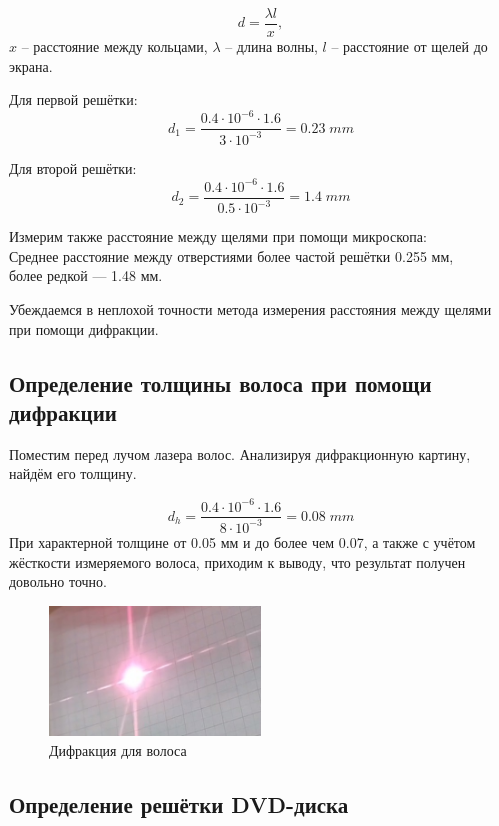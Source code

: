 \documentclass[titlepage, a4paper,12pt]{article}
\begin{document}
	$$ d = \frac{\lambda l}{x}, $$
	$x$ -- расстояние между кольцами, $\lambda$ -- длина волны, $l$ -- расстояние от щелей до экрана.
	
	Для первой решётки: \\
	$$ d_1 = \frac{0.4 \cdot 10^{-6} \cdot 1.6}{3 \cdot 10^{-3}} = 0.23 \; mm $$
	
	Для второй решётки: \\
	$$ d_2 = \frac{0.4 \cdot 10^{-6} \cdot 1.6}{0.5 \cdot 10^{-3}} = 1.4 \; mm $$
	
	
	Измерим также расстояние между щелями при помощи микроскопа:\\
	Среднее расстояние между отверстиями более частой решётки 0.255 мм, \\
	более редкой --- 1.48 мм.
	
	Убеждаемся в неплохой точности метода измерения расстояния между щелями при помощи дифракции.
	
	\subsection{Определение толщины волоса при помощи дифракции}
	
	Поместим перед лучом лазера волос. Анализируя дифракционную картину, найдём его толщину.
	
	$$ d_h = \frac{0.4 \cdot 10^{-6} \cdot 1.6}{8 \cdot 10^{-3}} = 0.08 \; mm  $$
	При характерной толщине от 0.05 мм и до более чем 0.07, а также с учётом жёсткости измеряемого волоса, приходим к выводу, что результат получен довольно точно.
	
	\begin{figure}[h!]
		\begin{center}
			\includegraphics[width = 0.5\textwidth]{3}
			\caption{Дифракция для волоса}
			\label{ris:3}
		\end{center}
	\end{figure}
	
	\subsection{Определение решётки DVD-диска}
	
\end{document}
